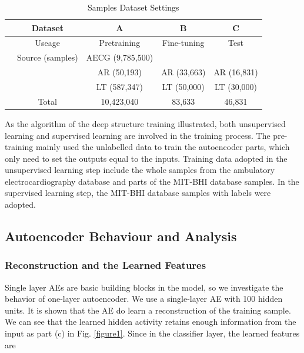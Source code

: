 \documentclass[journal]{IEEEtran}
\begin{document}
     
\begin{table}[!htbp]
\begin{center}
\begin{threeparttable}
\caption{Samples Dataset Settings}
\label{table3}
\begin{tabular}{ccccc}
\hline
& Dataset & A & B  &  C\\
\hline
& Useage  & Pretraining & Fine-tuning & Test \\
\hline
& Source (samples) & AECG (9,785,500)   &  &   \\
&  & AR (50,193)   & AR (33,663) & AR (16,831) \\
&  & LT (587,347)  & LT (50,000) & LT (30,000) \\
\hline
&Total & 10,423,040 & 83,633 & 46,831 \\
\hline
\end{tabular}
\end{threeparttable}
\end{center}
\end{table}

As the algorithm of the deep structure training illustrated, both unsupervised learning and supervised learning are involved in the training process. The pre-training mainly used the unlabelled data to train the autoencoder parts, which only need to set the outputs equal to the inputs. Training data adopted in the unsupervised learning step include the whole samples from the ambulatory electrocardiography database and parts of the MIT-BHI database samples. In the supervised learning step, the MIT-BHI database samples with labels were adopted.

\subsection{Autoencoder Behaviour and Analysis}
\subsubsection{Reconstruction and the Learned Features}
Single layer AEs are basic building blocks in the model, so we investigate the behavior of one-layer autoencoder. We use a single-layer AE with 100 hidden units. It is shown that the AE do learn a reconstruction of the training sample. We can see that the learned hidden activity retains enough information from the input as part (c) in Fig. \ref{figure1}. Since in the classifier layer, the learned features are 
\end{document}
